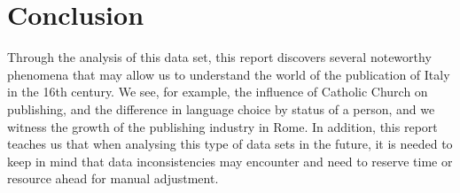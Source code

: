 \documentclass[11pt]{article}
\begin{document}
\section{Conclusion}
\label{Conclusion}
Through the analysis of this data set, this report discovers several noteworthy phenomena that may allow us to understand the world of the publication of Italy in the 16th century. We see, for example, the influence of Catholic Church on publishing, and the difference in language choice by status of a person, and we witness the growth of the publishing industry in Rome. In addition, this report teaches us that when analysing this type of data sets in the future, it is needed to keep in mind that data inconsistencies may encounter and need to reserve time or resource ahead for manual adjustment.
\end{document}
